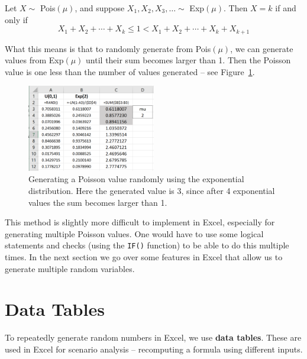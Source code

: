 Let $X \sim $ Pois$(\mu)$, and suppose $X_1, X_2, X_3, \ldots \sim $ Exp$(\mu)$.
Then $X = k$ if and only if \[ X_1 + X_2 + \cdots + X_k \leq 1 < X_1 + X_2 + \cdots + X_k + X_{k+1} \]

What this means is that to randomly generate from Pois$(\mu)$, we can generate values from Exp$(\mu)$ until their sum becomes larger than 1.
Then the Poisson value is one less than the number of values generated -- see Figure~\ref{fig:2_poisson}.

\begin{figure}[htbp]
	\centering
	\includegraphics[width=0.5\textwidth]{fig/2_poisson.png}
	\caption{Generating a Poisson value randomly using the exponential distribution. Here the generated value is 3, since after 4 exponential values the sum becomes larger than 1. \label{fig:2_poisson}}
\end{figure}

This method is slightly more difficult to implement in Excel, especially for generating multiple Poisson values.
One would have to use some logical statements and checks (using the \texttt{IF()} function) to be able to do this multiple times.
In the next section we go over some features in Excel that allow us to generate multiple random variables.


\section{Data Tables}

To repeatedly generate random numbers in Excel, we use \textbf{data tables}.
These are used in Excel for scenario analysis -- recomputing a formula using different inputs.

